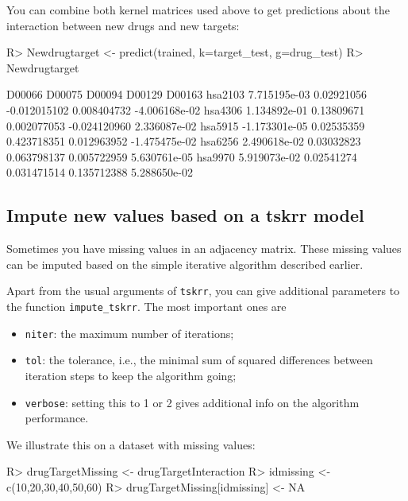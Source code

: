 \documentclass[
]{article}
\providecommand{\tightlist}{%
  \setlength{\itemsep}{0pt}\setlength{\parskip}{0pt}}
\begin{document}
You can combine both kernel matrices used above to get predictions about
the interaction between new drugs and new targets:

\begin{CodeChunk}

\begin{CodeInput}
R> Newdrugtarget <- predict(trained, k=target_test, g=drug_test)
R> Newdrugtarget
\end{CodeInput}

\begin{CodeOutput}
               D00066     D00075       D00094       D00129        D00163
hsa2103  7.715195e-03 0.02921056 -0.012015102  0.008404732 -4.006168e-02
hsa4306  1.134892e-01 0.13809671  0.002077053 -0.024120960  2.336087e-02
hsa5915 -1.173301e-05 0.02535359  0.423718351  0.012963952 -1.475475e-02
hsa6256  2.490618e-02 0.03032823  0.063798137  0.005722959  5.630761e-05
hsa9970  5.919073e-02 0.02541274  0.031471514  0.135712388  5.288650e-02
\end{CodeOutput}
\end{CodeChunk}

\hypertarget{impute-new-values-based-on-a-tskrr-model}{%
\subsection{Impute new values based on a tskrr
model}\label{impute-new-values-based-on-a-tskrr-model}}

Sometimes you have missing values in an adjacency matrix. These missing
values can be imputed based on the simple iterative algorithm described
earlier.

Apart from the usual arguments of \texttt{tskrr}, you can give
additional parameters to the function \texttt{impute\_tskrr}. The most
important ones are

\begin{itemize}
\tightlist
\item
  \texttt{niter}: the maximum number of iterations;
\item
  \texttt{tol}: the tolerance, i.e., the minimal sum of squared
  differences between iteration steps to keep the algorithm going;
\item
  \texttt{verbose}: setting this to 1 or 2 gives additional info on the
  algorithm performance.
\end{itemize}

We illustrate this on a dataset with missing values:

\begin{CodeChunk}

\begin{CodeInput}
R> drugTargetMissing <- drugTargetInteraction
R> idmissing <- c(10,20,30,40,50,60)
R> drugTargetMissing[idmissing] <- NA
\end{CodeInput}
\end{CodeChunk}
\end{document}
